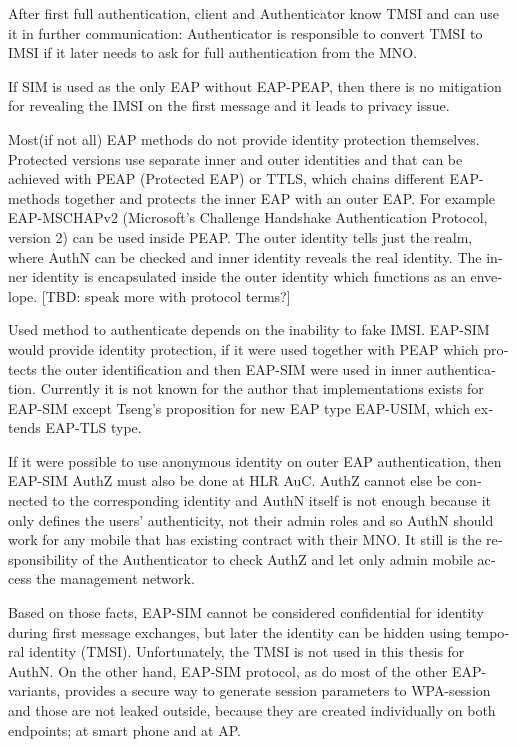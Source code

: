 \documentclass[12pt,a4paper,english]{tutthesis}
\begin{document}
\begin{otherlanguage}{english}
After first full authentication, client and Authenticator 
know TMSI and can use it in further communication: Authenticator 
is responsible to convert TMSI to IMSI if it later needs to 
ask for full authentication from the MNO.


If SIM is used as the only EAP without EAP-PEAP, then 
there is no mitigation for revealing the IMSI on the first message
and it leads to privacy issue.

Most(if not all) EAP methods do not provide identity protection
themselves. Protected versions
use separate  inner and outer identities and that can be achieved with
PEAP (Protected  EAP) or TTLS, which chains different EAP-methods together and
protects the inner EAP with an outer EAP. For example 
EAP-MSCHAPv2 (Microsoft's Challenge Handshake Authentication Protocol,
version 2) can be used inside PEAP.
The outer identity tells just the realm, where AuthN can be checked
 and inner identity reveals the real identity.
The inner identity is encapsulated inside the outer identity which
functions as an envelope. [TBD: speak more with protocol terms?]


Used method to authenticate depends on the inability to fake IMSI.
EAP-SIM would provide identity protection, if it were used together
with PEAP which protects the outer identification  and
then EAP-SIM were used in inner authentication.
Currently it is not known for the author that implementations exists for
EAP-SIM  except Tseng's proposition \cite{tseng-usim} for  new EAP type
EAP-USIM, which extends EAP-TLS type.

If it were possible to use anonymous identity on outer EAP
authentication, then EAP-SIM AuthZ must also be done at HLR AuC.
AuthZ cannot else be connected to the corresponding
identity and AuthN itself is not enough because it only defines the users'
authenticity, not their admin roles and so 
AuthN should work for any mobile that has existing contract with
their MNO. 
It still is the responsibility of the Authenticator to 
check AuthZ  and let only admin mobile access the management network.









Based on those facts, EAP-SIM cannot be considered confidential for identity
during first message exchanges, but later the identity can be hidden
using temporal identity (TMSI). Unfortunately, the TMSI is not used in
this thesis for AuthN. 
On the other hand, EAP-SIM protocol, as do most of the other
EAP-variants, provides a secure way to
generate session parameters to WPA-session and those are not leaked
outside, because they are created individually on both endpoints; 
at smart phone and at AP.

\end{otherlanguage}
\end{document}

